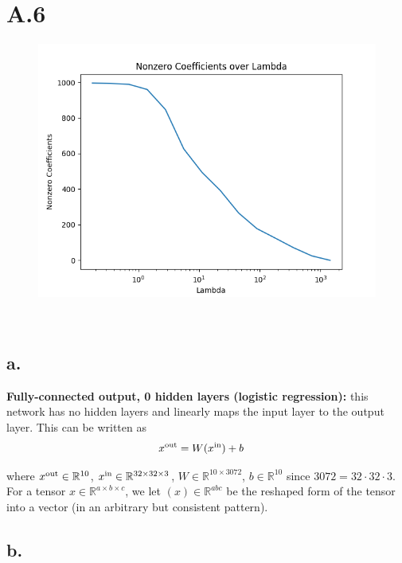 \documentclass{article}
\newcommand{\field}[1]{\mathbb{#1}}
\newcommand{\1}{\mathbf{1}}
\newcommand{\R}{\field{R}} %
\begin{document}
\section*{A.6}
{\Large 

\begin{figure}[h]
  \centering
  \includegraphics[width=120mm]{../hw2-code/results/a4_a.png}
\end{figure}

 \\

\subsection*{a.}

\textbf{Fully-connected output, 0 hidden layers (logistic regression):} this network has no hidden layers and linearly maps the input layer to the output layer. This can be written as 
  \begin{align*}
    x^{\rm out} &= W (x^{\rm in}) +b
  \end{align*} 
  
  where $x^{\rm out} \in \R^{10}$, $x^{\rm in} \in \R^{32 \times 32 \times 3}$, $W \in \R^{10 \times 3072}$, $b \in \R^{10}$ since $3072 = 32 \cdot 32 \cdot 3$. For a tensor $x \in \R^{a \times b \times c}$, we let $(x) \in \R^{a b c}$ be the reshaped form of the tensor into a vector (in an arbitrary but consistent pattern).

\subsection*{b.}

}
\end{document}
